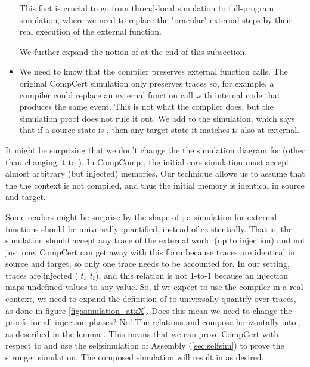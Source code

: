 \begin{itemize}
This fact is crucial to go from thread-local simulation to full-program simulation, where we need to replace the "oracular" external steps by their real execution of the external function. 

We further expand the notion of  at the end of this subsection.



\item We need to know that the compiler preserves external function calls. The original CompCert simulation only preserves traces so, for example, a compiler could replace an external function call with internal code that produces the same event. This is not what the compiler does, but the simulation proof does not rule it out.  We add  to the simulation, which says that if a source state is , then any target state it matches is also at external.  

\end{itemize}

It might be surprising that we don't change the the simulation diagram for  (other than changing it to ). In CompComp \cite{compcomp}, the initial core simulation must accept almost arbitrary (but injected) memories. Our technique allows us to assume that the the context is not compiled, and thus the initial memory is identical in source and target.

Some readers might be surprise by the shape of ; a simulation for external functions should be universally quantified, instead of existentially. That is, the simulation should accept any trace of the external world (up to injection) and not just one. CompCert can get away with this form because traces are identical in source and target, so only one trace needs to be accounted for.
In our setting, traces are injected ( $t_s$ $t_t$), and this relation is not 1-to-1 because an injection maps undefined values to any value. So, if we expect to use the compiler in a real context, we need to expand the definition of  to universally quantify over traces, as done in figure \ref{fig:simulation_atxX}. Does this mean we need to change the proofs for all injection phases? No! The relations  and  compose horizontally into , as described in the lemma . This means that we can prove CompCert with respect to  and use the selfsimulation of Assembly (\ref{sec:selfsim}) to prove the stronger simulation. The composed simulation will result in  as desired. 

